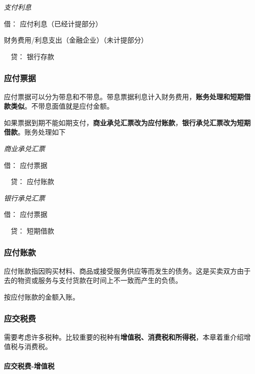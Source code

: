 \documentclass[UTF8,12pt]{ctexart}
\newenvironment{Dr}{\noindent 借：}{\par}
\newenvironment{Cr}{\noindent \ \ 贷：}{\par}
\numberwithin{equation}{section} %
\numberwithin{figure}{section}
\numberwithin{table}{section}
\begin{document}
	
	\textit{支付利息}
	
	\begin{Dr}
		应付利息（已经计提部分）
		
		财务费用/利息支出（金融企业）（未计提部分）
	\end{Dr}
	\begin{Cr}
		银行存款
	\end{Cr}
	

	
	\subsubsection{应付票据}
	应付票据可以分为带息和不带息。带息票据利息计入财务费用，\textbf{账务处理和短期借款类似}。不带息面值就是应付金额。
	
	如果票据到期不能如期支付，\textbf{商业承兑汇票改为应付账款}，\textbf{银行承兑汇票改为短期借款}。账务处理如下
	
	\textit{商业承兑汇票}
	
	\begin{Dr}
		应付票据
	\end{Dr}
	\begin{Cr}
		应付账款
	\end{Cr}

	
	\textit{银行承兑汇票}
	
	\begin{Dr}
		应付票据
	\end{Dr}
	\begin{Cr}
		短期借款
	\end{Cr}

	
	\subsubsection{应付账款}
	
	应付账款指因购买材料、商品或接受服务供应等而发生的债务。这是买卖双方由于去的物资或服务与支付货款在时间上不一致而产生的负债。
	
	按应付账款的金额入账。
	
	\subsubsection{应交税费}
	
	需要考虑许多税种。比较重要的税种有\textbf{增值税、消费税和所得税}，本章着重介绍增值税与消费税。
	
	\paragraph{应交税费-增值税}
	
\end{document}
